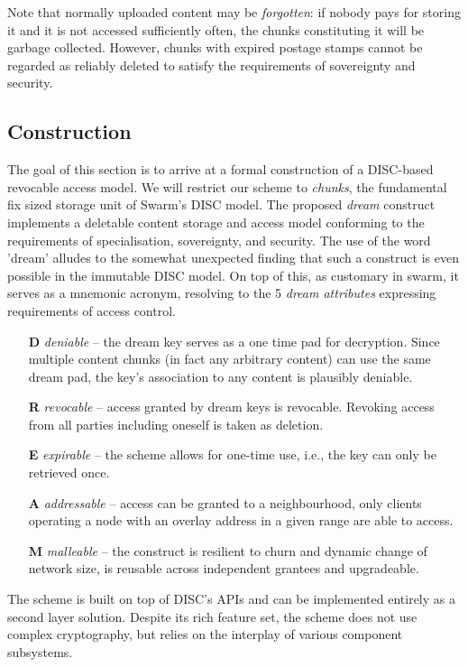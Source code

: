 Note that normally uploaded content may be \emph{forgotten}: if nobody pays for storing it and it is not accessed sufficiently often, the chunks constituting it will be garbage collected. However, chunks with  expired postage stamps cannot be regarded as reliably deleted to satisfy the requirements of sovereignty and security. 


\subsection{Construction}

The goal of this section is to arrive at a formal construction of a DISC-based revocable access model. We will restrict our scheme to \emph{chunks}, the fundamental fix sized storage unit of Swarm's DISC model.  The proposed \emph{dream} construct implements a  deletable content storage and access model conforming to the requirements of specialisation, sovereignty, and security. The use of the word 'dream' alludes to the somewhat unexpected finding that such a construct is even possible in the immutable DISC model. On top of this, as customary in swarm, it serves as a mnemonic acronym, resolving to the 5 \emph{dream attributes} expressing requirements of access control.

\begin{itemize}
    \item[\textbf{D}] \emph{deniable} -- the dream key serves as a one time pad for decryption. Since multiple content chunks (in fact any arbitrary content) can use the same dream pad, the key's association to any content is plausibly deniable.
    \item[\textbf{R}] \emph{revocable} -- access granted by dream keys is revocable. Revoking access from all parties including oneself is taken as deletion.   
    \item[\textbf{E}] \emph{expirable} -- the scheme allows for one-time use, i.e., the key can only be retrieved once.
    \item[\textbf{A}] \emph{addressable} -- access can be granted to a neighbourhood, only clients operating a node with an overlay address in a given range  are able to access.
    \item[\textbf{M}] \emph{malleable}  --  the construct is resilient to churn and dynamic change of network size, is reusable across independent grantees and upgradeable.
\end{itemize}

The scheme is built on top of DISC's APIs and can be implemented entirely as a second layer solution.  Despite its rich feature set, the scheme does not use complex cryptography, but relies on the interplay of various component subsystems.

